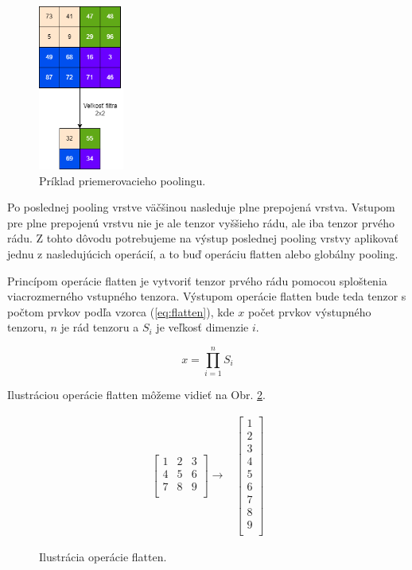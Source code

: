 \begin{figure}[H]
\centerline{\includegraphics[width=0.25\textwidth]{images/avgpool.drawio.png}}
\caption{Príklad priemerovacieho poolingu.}
\label{fig:avg_pooling}
\end{figure}

Po poslednej pooling vrstve väčšinou nasleduje plne prepojená vrstva. Vstupom pre
plne prepojenú vrstvu nie je ale tenzor vyššieho rádu, ale iba tenzor prvého rádu. Z
tohto dôvodu potrebujeme na výstup poslednej pooling vrstvy aplikovať jednu z nasledujúcich operácií, a to buď operáciu flatten alebo globálny pooling.


Princípom operácie flatten je vytvoriť tenzor prvého rádu pomocou sploštenia viacrozmerného vstupného tenzora. Výstupom operácie flatten bude teda tenzor s počtom prvkov podľa vzorca (\ref{eq:flatten}), kde $x$ počet prvkov výstupného tenzoru, $n$ je rád tenzoru
a $S_i$ je veľkosť dimenzie $i$.

\begin{equation}
x = \prod_{i=1}^{n} S_i
\label{eq:flatten}
\end{equation}

Ilustráciou operácie flatten môžeme vidieť na Obr. \ref{fig:flatten}.

\begin{figure}[H]
\begin{align*}
  \begin{bmatrix}
      1 & 2 & 3 \\
      4 & 5 & 6 \\
      7 & 8 & 9 \\
  \end{bmatrix}
  \longrightarrow 
  &
  \begin{bmatrix}
      1 \\
      2 \\
      3 \\
      4 \\
      5 \\
      6 \\
      7 \\
      8 \\
      9 \\
  \end{bmatrix}
\end{align*}
\caption{Ilustrácia operácie flatten.}
\label{fig:flatten}
\end{figure}

